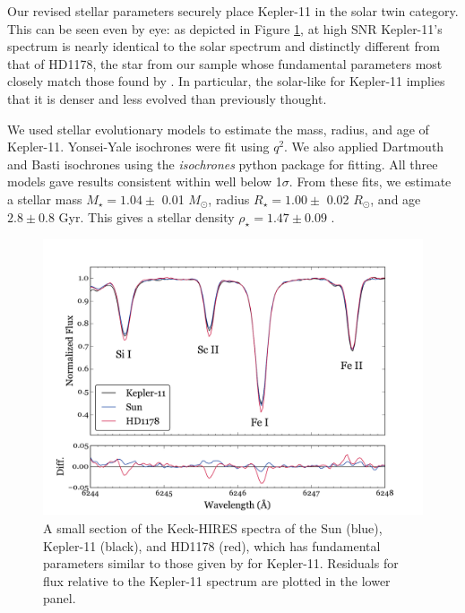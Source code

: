 \documentclass[oneside]{emulateapj}
\begin{document}
Our revised stellar parameters securely place Kepler-11 in the solar twin category. This can be seen even by eye: as depicted in Figure \ref{fig:spec}, at high SNR Kepler-11's spectrum is nearly identical to the solar spectrum and distinctly different from that of HD1178, the star from our sample whose fundamental parameters most closely match those found by \citet{Lissauer2013}. In particular, the solar-like \logg for Kepler-11 implies that it is denser and less evolved than previously thought.

We used stellar evolutionary models to estimate the mass, radius, and age of Kepler-11. Yonsei-Yale isochrones were fit using $q^2$. We also applied Dartmouth and Basti isochrones using the \textit{isochrones} python package for fitting. All three models gave results consistent within well below 1$\sigma$. From these fits, we estimate a stellar mass $M_{\star} = 1.04 \pm$ 0.01 $M_{\odot}$, radius $R_{\star} = 1.00 \pm$ 0.02 $R_{\odot}$, and age $2.8 \pm 0.8$ Gyr. This gives a stellar density $\rho_{\star} = 1.47 \pm 0.09$ \gcm.

\begin{figure}
\centering
\includegraphics[width=\columnwidth]{spec}
\caption{A small section of the Keck-HIRES spectra of the Sun (blue), Kepler-11 (black), and HD1178 (red), which has fundamental parameters similar to those given by \citet{Lissauer2013} for Kepler-11. Residuals for flux relative to the Kepler-11 spectrum are plotted in the lower panel.}
\label{fig:spec}
\end{figure}
\end{document}
